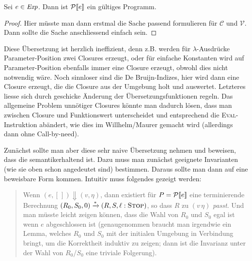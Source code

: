 \documentclass[12pt,fleqn]{article}
\begin{document}
\begin{lemma}
  Sei $e\in{\text{\it Exp\/}}$. Dann ist $\mathcal{P}\llbracket e \rrbracket$ ein g\"ultiges Programm.
\end{lemma}

\begin{proof}
  Hier m\"usste man dann erstmal die Sache passend formulieren f\"ur $\mathcal{C}$ und $\mathcal{V}$. Dann
  sollte die Sache anschliessend einfach sein.
\end{proof}

Diese \"Ubersetzung ist herzlich ineffizient, denn z.B. werden f\"ur $\lambda$-Ausdr\"ucke Parameter-Position
zwei Closures erzeugt, oder f\"ur einfache Konstanten wird auf Parameter-Position ebenfalls immer eine Closure
erzeugt, obwohl dies nicht notwendig w\"are. Noch sinnloser sind die De Bruijn-Indizes, hier wird dann eine
Closure erzeugt, die die Closure aus der Umgebung holt und auswertet. Letzteres liesse sich durch geschicke
\"Anderung der \"Ubersetzungsfunktionen regeln. Das allgemeine Problem unn\"otiger Closures k\"onnte man dadurch
l\"osen, dass man zwischen Closure und Funktionswert unterscheidet und entsprechend die \textsc{Eval}-Instruktion
ab\"andert, wie dies im Willhelm/Maurer gemacht wird (allerdings dann ohne Call-by-need).

Zun\"achst sollte man aber diese sehr naive \"Ubersetzung nehmen und beweisen, dass die semantikerhaltend ist. Dazu
muss man zun\"achst geeignete Invarianten (wie sie oben schon angedeutet sind) bestimmen. Daraus sollte man dann
auf eine beweisbare Form kommen. Intuitiv muss folgendes gezeigt werden:
\begin{quote}
  Wenn $(e,[\,]) \Downarrow (v,\eta)$, dann existiert f\"ur $P=\mathcal{P}\llbracket e \rrbracket$ eine terminierende Berechnung
  $(R_0,S_0,0) \xrightarrow* (R,S,\ell:\textsc{Stop})$, so dass $R$ zu $(v\,\eta)$ {\em passt}. Und
  man m\"usste leicht zeigen k\"onnen, dass die Wahl von $R_0$ und $S_0$ egal ist wenn $e$ abgeschlossen ist
  (genaugenommen braucht man irgendwie ein Lemma, welches $R_0$ und $S_0$ mit der initialen Umgebung in Verbindung
  bringt, um die
  Korrektheit induktiv zu zeigen; dann ist die Invarianz unter der Wahl von $R_0$/$S_0$ eine triviale Folgerung).
\end{quote}
\end{document}
